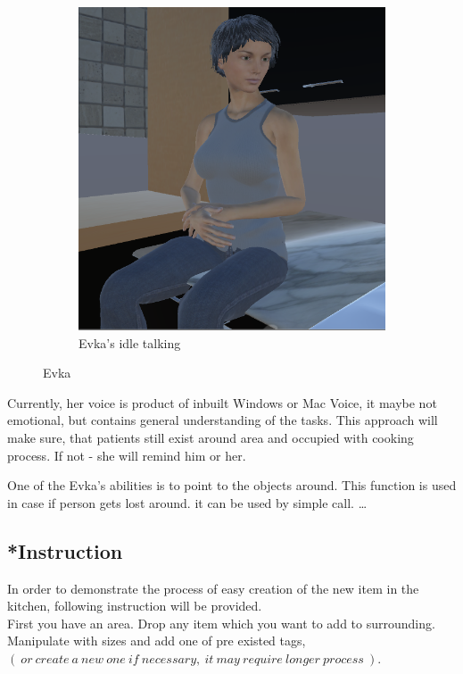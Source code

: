 \documentclass[18pt]{article}
\numberwithin{equation}{section} %
\numberwithin{figure}{section} %
\numberwithin{table}{section} %
\begin{document}
\begin{figure}[H]
\begin{subfigure}{0.4\textwidth}
			\includegraphics[width=0.96\linewidth]{images/Evka_sit_2}
			\caption{Evka's idle talking}
		\end{subfigure}		
		\caption{Evka}
		\label{fig:evkasit1}
	\end{figure}
	
	
	Currently, her voice is product of inbuilt Windows or Mac Voice, it maybe not emotional, but contains general understanding of the tasks. This approach will make sure, that patients still exist around area and occupied with cooking process. If not - she will remind him or her.
	
	
	One of the Evka's abilities is to point to the objects around. This function is used in case if person gets lost around. it can be used by simple call. \ldots
	\subsection{*Instruction}
	
	In order to demonstrate the process of easy creation of the new item in the kitchen, following instruction will be provided.\\
	
	First you have an area. Drop any item which you want to add to surrounding. Manipulate with sizes and add one of pre existed tags, $\left(\ or\ create\ a\ new\ one\ if\ necessary,\ it\ may\ require\ longer\ process\  \right) . $ \\
	
\end{document}
